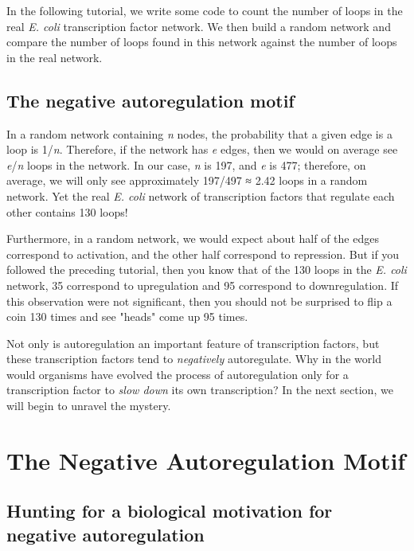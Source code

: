In the following tutorial, we write some code to count the number of loops in the real \textit{E. coli} transcription factor network. We then build a random network and compare the number of loops found in this network against the number of loops in the real network.

\FloatBarrier
{}
\subsection{The negative autoregulation motif}

In a random network containing \textit{n} nodes, the probability that a given edge is a loop is 1/\textit{n}. Therefore, if the network has \textit{e} edges, then we would on average see \textit{e}/\textit{n} loops in the network. In our case, \textit{n} is 197, and \textit{e} is 477; therefore, on average, we will only see approximately 197/497 ≈ 2.42 loops in a random network. Yet the real \textit{E. coli} network of transcription factors that regulate each other contains 130 loops!

Furthermore, in a random network, we would expect about half of the edges correspond to activation, and the other half correspond to repression. But if you followed the preceding tutorial, then you know that of the 130 loops in the \textit{E. coli} network, 35 correspond to upregulation and 95 correspond to downregulation. If this observation were not significant, then you should not be surprised to flip a coin 130 times and see "heads" come up 95 times.

Not only is autoregulation an important feature of transcription factors, but these transcription factors tend to \textit{negatively} autoregulate. Why in the world would organisms have evolved the process of autoregulation only for a transcription factor to \textit{slow down} its own transcription? In the next section, we will begin to unravel the mystery.


\FloatBarrier
{}

\section{The Negative Autoregulation Motif}
\label{sec:the_negative_autoregulation_motif}

\subsection{Hunting for a biological motivation for negative autoregulation}

